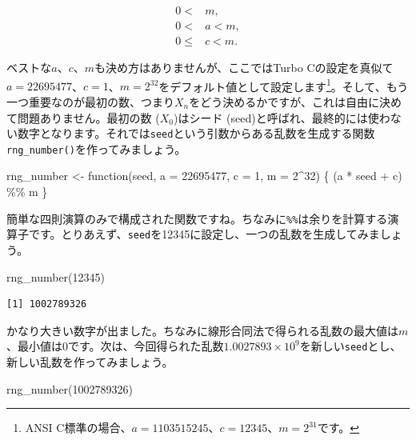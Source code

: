 \documentclass[
  a4paper,
  pandoc,
  ja=standard,
  jafont=haranoaji]{bxjsbook}
\newenvironment{Shaded}{\begin{snugshade}}{\end{snugshade}}
\newcommand{\AttributeTok}[1]{\textcolor[rgb]{0.00,0.48,0.65}{#1}}
\newcommand{\ControlFlowTok}[1]{\textcolor[rgb]{0.00,0.48,0.65}{#1}}
\newcommand{\DecValTok}[1]{\textcolor[rgb]{0.68,0.00,0.00}{#1}}
\newcommand{\FunctionTok}[1]{\textcolor[rgb]{0.28,0.35,0.67}{#1}}
\newcommand{\NormalTok}[1]{\textcolor[rgb]{0.00,0.48,0.65}{#1}}
\newcommand{\OtherTok}[1]{\textcolor[rgb]{0.00,0.48,0.65}{#1}}
\newcommand{\SpecialCharTok}[1]{\textcolor[rgb]{0.37,0.37,0.37}{#1}}
\begin{document}
\begin{align}
0 < &  m, \\
0 < &  a < m, \\
0 \leq &  c < m.
\end{align}

ベストな\(a\)、\(c\)、\(m\)も決め方はありませんが、ここではTurbo
Cの設定を真似て\(a = 22695477\)、\(c = 1\)、\(m = 2^{32}\)をデフォルト値として設定します\footnote{ANSI
  C標準の場合、\(a = 1103515245\)、\(c = 12345\)、\(m = 2^{31}\)です。}。そして、もう一つ重要なのが最初の数、つまり\(X_n\)をどう決めるかですが、これは自由に決めて問題ありません。最初の数
(\(X_0\))はシード
(seed)と呼ばれ、最終的には使わない数字となります。それでは\texttt{seed}という引数からある乱数を生成する関数\texttt{rng\_number()}を作ってみましょう。

\begin{Shaded}
\begin{Highlighting}[numbers=left,,]
\NormalTok{rng\_number }\OtherTok{\textless{}{-}} \ControlFlowTok{function}\NormalTok{(seed, }\AttributeTok{a =} \DecValTok{22695477}\NormalTok{, }\AttributeTok{c =} \DecValTok{1}\NormalTok{, }\AttributeTok{m =} \DecValTok{2}\SpecialCharTok{\^{}}\DecValTok{32}\NormalTok{) \{}
\NormalTok{  (a }\SpecialCharTok{*}\NormalTok{ seed }\SpecialCharTok{+}\NormalTok{ c) }\SpecialCharTok{\%\%}\NormalTok{ m}
\NormalTok{\}}
\end{Highlighting}
\end{Shaded}

簡単な四則演算のみで構成された関数ですね。ちなみに\texttt{\%\%}は余りを計算する演算子です。とりあえず、\texttt{seed}を12345に設定し、一つの乱数を生成してみましょう。

\begin{Shaded}
\begin{Highlighting}[numbers=left,,]
\FunctionTok{rng\_number}\NormalTok{(}\DecValTok{12345}\NormalTok{)}
\end{Highlighting}
\end{Shaded}

\begin{verbatim}
[1] 1002789326
\end{verbatim}

かなり大きい数字が出ました。ちなみに線形合同法で得られる乱数の最大値は\(m\)、最小値は0です。次は、今回得られた乱数\ensuremath{1.0027893\times 10^{9}}を新しい\texttt{seed}とし、新しい乱数を作ってみましょう。

\begin{Shaded}
\begin{Highlighting}[numbers=left,,]
\FunctionTok{rng\_number}\NormalTok{(}\DecValTok{1002789326}\NormalTok{)}
\end{Highlighting}
\end{Shaded}
\end{document}
